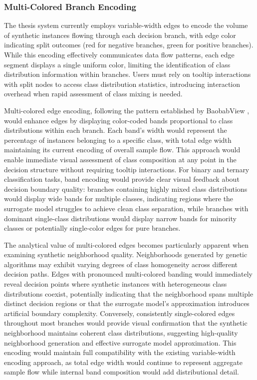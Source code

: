 \subsubsection{Multi-Colored Branch Encoding}

The thesis system currently employs variable-width edges to encode the volume of synthetic instances flowing through each decision branch, with edge color indicating split outcomes (red for negative branches, green for positive branches). While this encoding effectively communicates data flow patterns, each edge segment displays a single uniform color, limiting the identification of class distribution information within branches. Users must rely on tooltip interactions with split nodes to access class distribution statistics, introducing interaction overhead when rapid assessment of class mixing is needed.

Multi-colored edge encoding, following the pattern established by BaobabView \cite{elzen2011baobabview}, would enhance edges by displaying color-coded bands proportional to class distributions within each branch. Each band's width would represent the percentage of instances belonging to a specific class, with total edge width maintaining its current encoding of overall sample flow. This approach would enable immediate visual assessment of class composition at any point in the decision structure without requiring tooltip interactions. For binary and ternary classification tasks, band encoding would provide clear visual feedback about decision boundary quality: branches containing highly mixed class distributions would display wide bands for multiple classes, indicating regions where the surrogate model struggles to achieve clean class separation, while branches with dominant single-class distributions would display narrow bands for minority classes or potentially single-color edges for pure branches.

The analytical value of multi-colored edges becomes particularly apparent when examining synthetic neighborhood quality. Neighborhoods generated by genetic algorithms may exhibit varying degrees of class homogeneity across different decision paths. Edges with pronounced multi-colored banding would immediately reveal decision points where synthetic instances with heterogeneous class distributions coexist, potentially indicating that the neighborhood spans multiple distinct decision regions or that the surrogate model's approximation introduces artificial boundary complexity. Conversely, consistently single-colored edges throughout most branches would provide visual confirmation that the synthetic neighborhood maintains coherent class distributions, suggesting high-quality neighborhood generation and effective surrogate model approximation. This encoding would maintain full compatibility with the existing variable-width encoding approach, as total edge width would continue to represent aggregate sample flow while internal band composition would add distributional detail.

